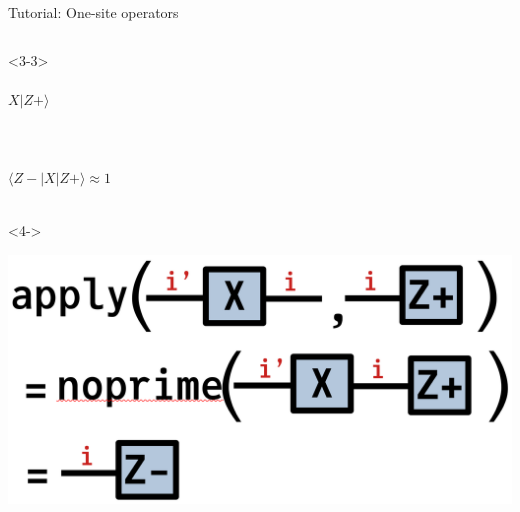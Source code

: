 \begin{frame}[fragile]{Tutorial: One-site operators}
\begin{columns}
\begin{column}{4.5cm}
\begin{onlyenv}<3-3>
\vspace*{0.1cm}
~\\
~\\
$X|Z+\rangle$ \\
~\\
~\\
~\\
$\langle Z-|X|Z+\rangle \approx 1$ \\
~\\
\end{onlyenv}

\begin{onlyenv}<4->
\vspace*{0.2cm}
~\\
\begin{center}
\includegraphics[width=1.0\textwidth]{
  slides/assets/apply_XZp.png
}
\end{center}
\vspace*{0.0cm}
\end{onlyenv}

\end{column}

\end{columns}

\end{frame}
